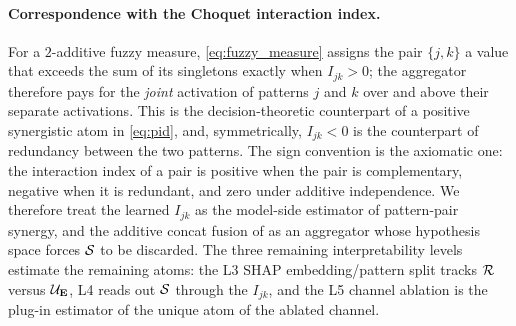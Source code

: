 \paragraph{Correspondence with the Choquet interaction index.}
For a $2$-additive fuzzy measure, \cref{eq:fuzzy_measure} assigns
the pair $\{j,k\}$ a value that exceeds the sum of its singletons
exactly when $I_{jk}>0$; the aggregator therefore pays for the
\emph{joint} activation of patterns $j$ and $k$ over and above
their separate
activations.\cite{grabisch1996application,marichal2000determination}
This is the decision-theoretic counterpart of a positive
synergistic atom in \cref{eq:pid}, and, symmetrically, $I_{jk}<0$
is the counterpart of redundancy between the two patterns.
The sign convention is the axiomatic one: the interaction index of a
pair is positive when the pair is complementary, negative when it is
redundant, and zero under additive
independence.\cite{grabisch1999interaction}
We therefore treat the learned $I_{jk}$ as the model-side estimator
of pattern-pair synergy, and the additive concat fusion of
\piabmil{} as an aggregator whose hypothesis space forces
$\mathcal{S}$ to be discarded.
The three remaining interpretability levels estimate the remaining
atoms: the L3 SHAP embedding/pattern split tracks $\mathcal{R}$ versus
$\mathcal{U}_{\mathbf{E}}$, L4 reads out $\mathcal{S}$ through the $I_{jk}$, and
the L5 channel ablation is the plug-in estimator of the unique atom
of the ablated channel.

